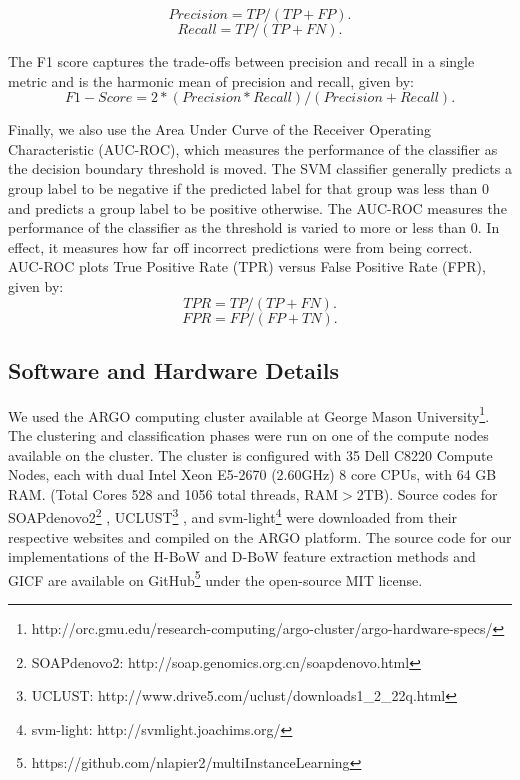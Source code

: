 \begin{equation}
Precision = TP / (TP + FP). \label{eqn:prec}
\end{equation}
\begin{equation}
Recall = TP / (TP +FN). \label{eqn:roc}
\end{equation}

The F1 score captures the trade-offs between precision and recall in a
single metric and is the harmonic mean of precision and recall, given by:
\begin{equation}
F1-Score = 2 * (Precision * Recall)/ (Precision + Recall). \label{eqn:f1}
\end{equation}

Finally, we also use the Area Under Curve of the Receiver Operating Characteristic (AUC-ROC), which measures the performance of the classifier as the decision boundary threshold is moved. The SVM classifier generally predicts a group label to be negative if the predicted label for that group was less than 0 and predicts a group label to be positive otherwise. The AUC-ROC measures the performance of the classifier as the threshold is varied to more or less than 0. In effect, it measures how far off incorrect predictions were from being correct. AUC-ROC plots True Positive Rate (TPR) versus False Positive Rate (FPR), given by:
\begin{equation}
TPR  = TP / (TP + FN). \label{eqn:roc}
\end{equation}
\begin{equation}
FPR = FP / (FP + TN). \label{eqn:prec}
\end{equation}

\subsection{Software and Hardware Details}
We used the ARGO computing cluster available at George Mason University\footnote{http://orc.gmu.edu/research-computing/argo-cluster/argo-hardware-specs/}. The clustering and classification phases were run on one of the compute nodes available on the cluster. The cluster is configured with 35 Dell C8220 Compute Nodes, each with dual Intel Xeon E5-2670 (2.60GHz) 8 core CPUs, with 64 GB RAM. (Total Cores 528 and 1056 total threads, RAM$>$2TB). Source codes for 
SOAPdenovo2\footnote{SOAPdenovo2: http://soap.genomics.org.cn/soapdenovo.html} \cite{luo12}, UCLUST\footnote{UCLUST: http://www.drive5.com/uclust/downloads1\_{}2\_{}22q.html}    \cite{Edgar10}, and svm-light\footnote{svm-light: http://svmlight.joachims.org/} \cite{joachims08}
were downloaded from their respective websites and compiled on the ARGO platform. The source code for our implementations of the H-BoW and D-BoW feature extraction methods and GICF are available on GitHub\footnote{https://github.com/nlapier2/multiInstanceLearning}
under the open-source MIT license.
